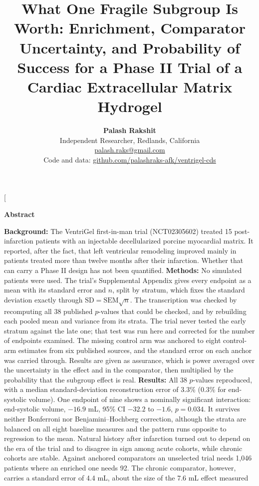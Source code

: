 \documentclass[10pt,twocolumn,letterpaper]{article}
\title{\vspace{-2.0cm}\LARGE\textbf{What One Fragile Subgroup Is Worth: Enrichment, Comparator
Uncertainty, and Probability of Success for a Phase II Trial of a Cardiac Extracellular Matrix
Hydrogel}}
\author{
    \large \textbf{Palash Rakshit} \\
    \normalsize Independent Researcher, Redlands, California \\
    \normalsize \href{mailto:palash.raks@gmail.com}{palash.raks@gmail.com} \\
    \normalsize Code and data: \href{https://github.com/palashraks-afk/ventrigel-cds}{github.com/palashraks-afk/ventrigel-cds}
}
\date{}
\begin{document}
\twocolumn[
  \begin{@twocolumnfalse}
    \maketitle
    \vspace{-1.1cm}
    \begin{center}\large\textbf{Abstract}\end{center}
    \noindent\normalsize
    \textbf{Background:} The VentriGel first-in-man trial (NCT02305602) treated 15 post-infarction
    patients with an injectable decellularized porcine myocardial matrix. It reported, after the
    fact, that left ventricular remodeling improved mainly in patients treated more than twelve
    months after their infarction. Whether that can carry a Phase II design has not been quantified.
    \textbf{Methods:} No simulated patients were used. The trial's Supplemental Appendix gives every
    endpoint as a mean with its standard error and $n$, split by stratum, which fixes the standard
    deviation exactly through $\mathrm{SD}=\mathrm{SEM}\sqrt{n}$. The transcription was checked by
    recomputing all 38 published $p$-values that could be checked, and by rebuilding each pooled
    mean and variance from its strata. The trial never tested the early stratum against the late
    one; that test was run here and corrected for the number of endpoints examined. The missing
    control arm was anchored to eight control-arm estimates from six published sources, and the
    standard error on each anchor was carried through. Results are given as assurance, which is
    power averaged over the uncertainty in the effect and in the comparator, then multiplied by the
    probability that the subgroup effect is real.
    \textbf{Results:} All 38 $p$-values reproduced, with a median standard-deviation reconstruction
    error of 3.3\% (0.3\% for end-systolic volume). One endpoint of nine shows a nominally
    significant interaction: end-systolic volume, $-16.9$ mL, 95\% CI $-32.2$ to $-1.6$, $p=0.034$.
    It survives neither Bonferroni nor Benjamini--Hochberg correction, although the strata are
    balanced on all eight baseline measures and the pattern runs opposite to regression to the mean.
    Natural history after infarction turned out to depend on the era of the trial and to disagree in
    sign among acute cohorts, while chronic cohorts are stable. Against anchored comparators an
    unselected trial needs 1{,}046 patients where an enriched one needs 92. The chronic comparator,
    however, carries a standard error of 4.4 mL, about the size of the 7.6 mL effect measured

\end{@twocolumnfalse}
\end{document}
